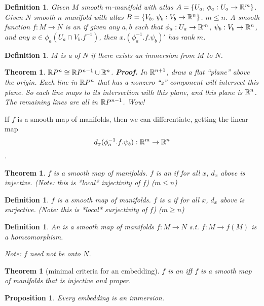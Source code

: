 \documentclass[11pt]{amsbook}
\theoremstyle{mystyle} \newtheorem{thrm}[thm]{Theorem}
\theoremstyle{mystyle} \newtheorem{defi}[thm]{Definition}
\theoremstyle{mystyle} \newtheorem{coro}[thm]{Corollary}
\theoremstyle{mystyle} \newtheorem{propo}[thm]{Proposition}
\theoremstyle{mystyle} \newtheorem{lemm}[thm]{Lemma}
\numberwithin{thm}{section}
\begin{document}
\begin{defi}
	Given $M$ smooth $m$-manifold with atlas $A = \{ U_a, \,\phi_a : U_a \to {\mathbb R}^m \}$.
	Given $N$ smooth $n$-manifold with atlas $B = \{ V_b, \,\psi_b : V_b \to {\mathbb R}^n \}$.
	$m \leq n$.
	A smooth function $f : M \to N$  is an  if given any $a, b$ such that $\phi_a: U_a \to {\mathbb R}^m$, $\psi_b: V_b \to {\mathbb R}^n$, and any $x \in \phi_a(U_a \cap V_b.f^{-1})$, then $x.(\phi_a^{-1}.f.\psi_b)'$ has rank $m$.
\end{defi}

\begin{defi}
	$M$ is a  of $N$ if there exists an immersion from $M$ to $N$.
\end{defi}

\begin{thrm}
	${\mathbb R} P^n \mathrel{\cong} {\mathbb R} P^{n-1} \cup {\mathbb R}^n$.
	\textbf{Proof.}  In ${\mathbb R}^{n+1}$, draw a flat ``plane'' above the origin.  Each line in ${\mathbb R} P^n$ that has a nonzero ``z'' component will intersect this plane.  So each line maps to its intersection with this plane, and this plane is ${\mathbb R}^n$.  The remaining lines are all in ${\mathbb R} P^{n-1}$.  Wow!
\end{thrm}



If $f$ is a smooth map of manifolds, then we can differentiate, getting the linear map $$d_x(\phi_a^{-1}.f.\psi_b): {\mathbb R}^m \to {\mathbb R}^n$$.

\begin{thrm}
	$f$ is a smooth map of manifolds.
	$f$ is an  if for all $x$, $d_x$ above is injective.  (Note: this is *local* injectivity of $f$) ($m \leq n$)
\end{thrm}

\begin{defi}
	$f$ is a smooth map of manifolds.
	$f$ is a  if for all $x$, $d_x$ above is surjective.  (Note: this is *local* surjectivity of $f$) ($m \geq n$)
\end{defi}

\begin{defi}
	An  is a smooth map of manifolds $f: M \to N$ s.t. $f : M \to f(M)$ is a homeomorphism.

	Note: $f$ need not be onto $N$.
\end{defi}
\begin{thrm}[minimal criteria for an embedding]
	$f$ is an  iff $f$ is a smooth map of manifolds that is injective and proper.
\end{thrm}
\begin{propo}
	Every embedding is an immersion.
\end{propo}
\end{document}
